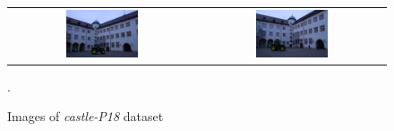 \begin{figure}[tbhp]
\begin{tabular}{cc}
\includegraphics[width=0.4\textwidth]{./img/ch-incr-dens/castle/0017_smal}&
\includegraphics[width=0.4\textwidth]{./img/ch-incr-dens/castle/0018_smal}\\
\end{tabular}
\caption{Images of \emph{castle-P18} dataset}.
\label{fig:castleOriginal}
\end{figure}




